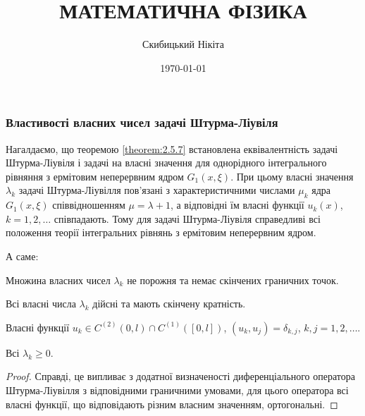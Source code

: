 

\title{{\Huge МАТЕМАТИЧНА ФІЗИКА}}
\author{Скибицький Нікіта}
\date{\today}





\tableofcontents

\setcounter{section}{2}
\setcounter{subsection}{5}
\setcounter{subsubsection}{3}
\setcounter{theorem}{8}
\setcounter{equation}{36}

\subsubsection{Властивості власних чисел задачі Штурма-Ліувіля}

Нагалдаємо, що теоремою \ref{theorem:2.5.7} встановлена еквівалентність задачі Штурма-Ліувіля і задачі на власні значення для однорідного інтегрального рівняння з ермітовим неперервним ядром $G_1(x, \xi)$. При цьому власні значення $\lambda_k$ задачі Штурма-Ліувілля пов'язані з характеристичними числами $\mu_k$ ядра $G_1(x, \xi)$ співвідношенням $\mu = \lambda + 1$, а відповідні їм власні функції $u_k(x)$, $k = 1, 2, \ldots$ співпадають. Тому для задачі Штурма-Ліувіля справедливі всі положення теорії інтегральних рівнянь з ермітовим неперервним ядром. \medskip

А саме:
\begin{proposition}
	Множина власних чисел $\lambda_k$ не порожня та немає скінчених граничних точок.
\end{proposition}
	
\begin{proposition}
	Всі власні числа $\lambda_k$ дійсні та мають скінчену кратність.
\end{proposition}
	
\begin{proposition}
	Власні функції $u_k\in C^{(2)}(0,l)\cap C^{(1)}([0, l])$, $(u_k, u_j) = \delta_{k,j}$, $k,j=1,2,\ldots$.
\end{proposition}
	
\begin{proposition}
	Всі $\lambda_k \ge 0$.
\end{proposition}

\begin{proof}
	Справді, це випливає з додатної визначеності диференціального оператора Штурма-Ліувілля з відповідними граничними умовами, для цього оператора всі власні функції, що відповідають різним власним значенням, ортогональні.
\end{proof}

